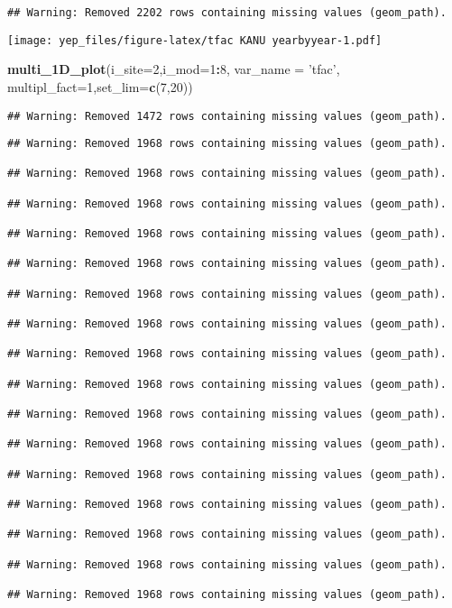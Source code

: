 \documentclass[]{article}
\newenvironment{Shaded}{\begin{snugshade}}{\end{snugshade}}
\newcommand{\DataTypeTok}[1]{\textcolor[rgb]{0.13,0.29,0.53}{#1}}
\newcommand{\DecValTok}[1]{\textcolor[rgb]{0.00,0.00,0.81}{#1}}
\newcommand{\KeywordTok}[1]{\textcolor[rgb]{0.13,0.29,0.53}{\textbf{#1}}}
\newcommand{\NormalTok}[1]{#1}
\newcommand{\OperatorTok}[1]{\textcolor[rgb]{0.81,0.36,0.00}{\textbf{#1}}}
\newcommand{\StringTok}[1]{\textcolor[rgb]{0.31,0.60,0.02}{#1}}
\begin{document}
\begin{verbatim}
## Warning: Removed 2202 rows containing missing values (geom_path).
\end{verbatim}

\texttt{[image: yep\_files/figure-latex/tfac KANU yearbyyear-1.pdf]}

\begin{Shaded}
\begin{Highlighting}[]
\KeywordTok{multi_1D_plot}\NormalTok{(}\DataTypeTok{i_site=}\DecValTok{2}\NormalTok{,}\DataTypeTok{i_mod=}\DecValTok{1}\OperatorTok{:}\DecValTok{8}\NormalTok{, }\DataTypeTok{var_name =} \StringTok{'tfac'}\NormalTok{,  }\DataTypeTok{multipl_fact=}\DecValTok{1}\NormalTok{,}\DataTypeTok{set_lim=}\KeywordTok{c}\NormalTok{(}\DecValTok{7}\NormalTok{,}\DecValTok{20}\NormalTok{))  }
\end{Highlighting}
\end{Shaded}

\begin{verbatim}
## Warning: Removed 1472 rows containing missing values (geom_path).
\end{verbatim}

\begin{verbatim}
## Warning: Removed 1968 rows containing missing values (geom_path).

## Warning: Removed 1968 rows containing missing values (geom_path).

## Warning: Removed 1968 rows containing missing values (geom_path).

## Warning: Removed 1968 rows containing missing values (geom_path).

## Warning: Removed 1968 rows containing missing values (geom_path).

## Warning: Removed 1968 rows containing missing values (geom_path).

## Warning: Removed 1968 rows containing missing values (geom_path).

## Warning: Removed 1968 rows containing missing values (geom_path).

## Warning: Removed 1968 rows containing missing values (geom_path).

## Warning: Removed 1968 rows containing missing values (geom_path).

## Warning: Removed 1968 rows containing missing values (geom_path).

## Warning: Removed 1968 rows containing missing values (geom_path).

## Warning: Removed 1968 rows containing missing values (geom_path).

## Warning: Removed 1968 rows containing missing values (geom_path).

## Warning: Removed 1968 rows containing missing values (geom_path).

## Warning: Removed 1968 rows containing missing values (geom_path).
\end{verbatim}
\end{document}
